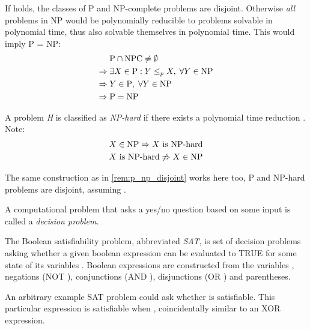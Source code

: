 \begin{remark}\label{rem:p_np_disjoint}
	If \ilmath{\pclass \neq \NP} holds, the classes of P and NP-complete problems are disjoint. Otherwise \emph{all} problems in NP would be polynomially reducible to problems solvable in polynomial time, thus also solvable themselves in polynomial time. This would imply P = NP: 
	\begin{align*}
		& \text{P} \cap \text{NPC} \neq \emptyset \\
		\Rightarrow \; & \exists X \in \text{P} : Y \leq_p X, \; \forall Y \in \text{NP} \\
		\Rightarrow \; & Y \in \text{P}, \; \forall Y \in \text{NP} \\
		\Rightarrow \; & \text{P} = \text{NP}
	\end{align*}
\end{remark}

\begin{definition}\label{def:np_hard}
	A problem \emph{H} is classified as \emph{NP-hard} if there exists a polynomial time reduction . Note:
	\begin{align*}
		X \in \text{NP} \Rightarrow X \text{ is NP-hard} \\
		X \text{ is NP-hard} \not\Rightarrow X \in \text{NP}
	\end{align*}
\end{definition}

\begin{remark}\label{rem:p_np_hard_disjoint}
	The same construction as in \cref{rem:p_np_disjoint} works here too, P and NP-hard problems are disjoint, assuming \ilmath{\pclass \neq \NP}.
\end{remark}

A computational problem that asks a yes/no question based on some input is called a \emph{decision problem}. 

The Boolean satisfiability problem, abbreviated \emph{SAT}, is set of decision problems asking whether a given boolean expression can be evaluated to TRUE for some state of its variables . 
Boolean expressions are constructed from the variables , negations (NOT \ilmath{\neg}), conjunctions (AND \ilmath{\land}), disjunctions (OR \ilmath{\lor}) and parentheses. 

An arbitrary example SAT problem could ask whether  is satisfiable. This particular expression is satisfiable when , coincidentally similar to an XOR expression.




